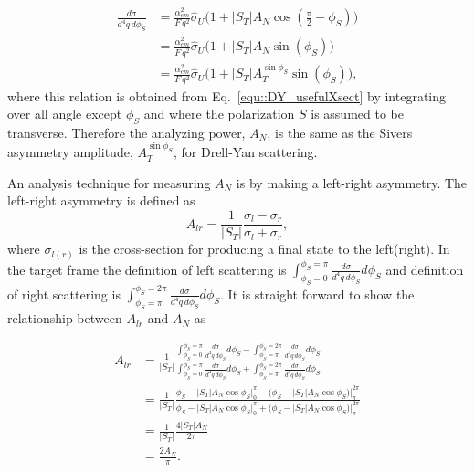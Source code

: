\begin{align}
  \frac{d\sigma}{d^4 q \, d \phi_S} &= \frac{\alpha_{em}^2}{F \,
    q^2}\hat{\sigma}_U\Big(1+|S_T|A_N \cos (\frac{\pi}{2} - \phi_S) \Big)
  \\ \nonumber
  &= \frac{\alpha_{em}^2}{F \,
    q^2}\hat{\sigma}_U\Big(1+|S_T|A_N \sin(\phi_S) \Big)
  \\ \nonumber
  &= \frac{\alpha_{em}^2}{F \,
    q^2}\hat{\sigma}_U \Big(1+|S_T| A_{T}^{\sin \phi_S} \sin(\phi_S)\Big),
\end{align}
\noindent
where this relation is obtained from Eq.~\ref{equ::DY_usefulXsect} by
integrating over all angle except $\phi_S$ and where the polarization $S$ is
assumed to be transverse.  Therefore the analyzing power, $A_N$, is the same as
the Sivers asymmetry amplitude, $A_{T}^{\sin \phi_S}$, for Drell-Yan scattering.

An analysis technique for measuring $A_N$ is by making a left-right asymmetry.
The left-right asymmetry is defined as 
\begin{equation}
  A_{lr} = \frac{1}{|S_T|}\frac{\sigma_l - \sigma_r}{\sigma_l + \sigma_r},
\end{equation}
\noindent
where $\sigma_{l(r)}$ is the cross-section for producing a final state to
the left(right).  In the target frame the definition of left scattering is
$\int_{\phi_S=0}^{\phi_S=\pi}\frac{d\sigma}{d^4 q \, d \phi_S} d\phi_S$ and
definition of right scattering is
$\int_{\phi_S=\pi}^{\phi_S=2\pi}\frac{d\sigma}{d^4 q \, d \phi_S} d\phi_S$.  It
is straight forward to show the relationship between $A_{lr}$ and $A_N$ as

\begin{align}
  A_{lr} &= \frac{1}{|S_T|}
  \frac{\int_{\phi_S=0}^{\phi_S=\pi} \frac{d\sigma}{d^4 q \, d \phi_S}d\phi_S
    - \int_{\phi_S=\pi}^{\phi_S=2\pi}\frac{d\sigma}{d^4 q \, d \phi_S}d\phi_S}
       {\int_{\phi_S=0}^{\phi_S=\pi}\frac{d\sigma}{d^4 q \, d \phi_S}d\phi_S
         + \int_{\phi_S=\pi}^{\phi_S=2\pi}\frac{d\sigma}{d^4 q \, d \phi_S}d\phi_S}
       \\ \nonumber
       &= \frac{1}{|S_T|}
       \frac{\phi_S -|S_T|A_N\cos\phi_S \Big|_0^{\pi}
       - \Big(\phi_S -|S_T|A_N\cos\phi_S \Big)\Big|_{\pi}^{2\pi}}
            {\phi_S -|S_T|A_N\cos\phi_S \Big|_0^{\pi}
              + \Big(\phi_S -|S_T|A_N\cos\phi_S \Big)\Big|_{\pi}^{2\pi}}
            \\ \nonumber
            &= \frac{1}{|S_T|}
            \frac{4|S_T|A_N}{2\pi}
            \\ \nonumber
            &= \frac{2A_N}{\pi}.
\end{align}

